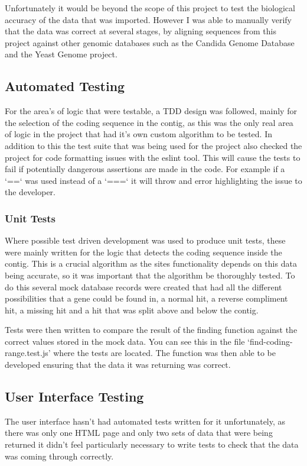 Unfortunately it would be beyond the scope of this project to test the biological accuracy of the data that was imported. However I was able to manually verify that the data was correct at several stages, by aligning sequences from this project against other genomic databases such as the Candida Genome Database\cite{cgd} and the Yeast Genome\cite{sgd} project. 

\subsection{Automated Testing}
For the area's of logic that were testable, a TDD design was followed, mainly for the selection of the coding sequence in the contig, as this was the only real area of logic in the project that had it's own custom algorithm to be tested. In addition to this the test suite that was being used for the project also checked the project for code formatting issues with the eslint\cite{eslint} tool. This will cause the tests to fail if potentially dangerous assertions are made in the code. For example if a `==` was used instead of a `===` it will throw and error highlighting the issue to the developer. 

\subsubsection{Unit Tests}
Where possible test driven development was used to produce unit tests, these were mainly written for the logic that detects the coding sequence inside the contig. This is a crucial algorithm as the sites functionality depends on this data being accurate, so it was important that the algorithm be thoroughly tested. To do this several mock database records were created that had all the different possibilities that a gene could be found in, a normal hit, a reverse compliment hit, a missing hit and a hit that was split above and below the contig. 

Tests were then written to compare the result of the finding function against the correct values stored in the mock data. You can see this in the file `find-coding-range.test.js' where the tests are located. The function was then able to be developed ensuring that the data it was returning was correct. 

\subsection{User Interface Testing}
The user interface hasn't had automated tests written for it unfortunately, as there was only one HTML page and only two sets of data that were being returned it didn't feel particularly necessary to write tests to check that the data was coming through correctly. 

